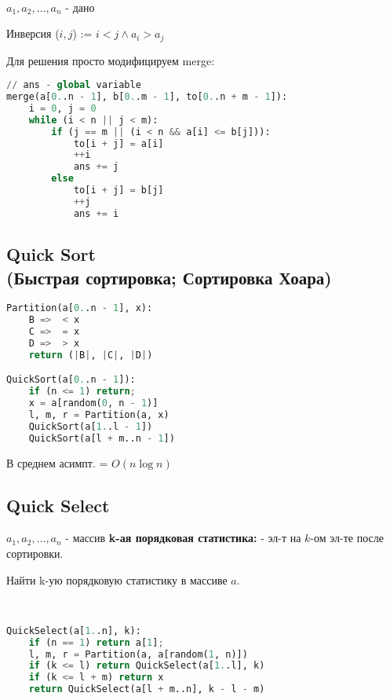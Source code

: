 \begin{task}
~\newline

$a_1, a_2, \ldots , a_n$ - дано

Инверсия ($i, j$) := $ i < j \land a_i > a_j$
\end{task}
\begin{solution}
Для решения просто модифицируем merge:

\lstset{style=mystyle}
\begin{lstlisting}[language=Python, caption=Merge for inversions]
// ans - global variable
merge(a[0..n - 1], b[0..m - 1], to[0..n + m - 1]):
    i = 0, j = 0
    while (i < n || j < m):
        if (j == m || (i < n && a[i] <= b[j])):
            to[i + j] = a[i]
            ++i
            ans += j
        else
            to[i + j] = b[j]
            ++j
            ans += i
\end{lstlisting}
\end{solution}

\subsection{Quick Sort \\ (Быстрая сортировка; Сортировка Хоара)}
\lstset{style=mystyle}
\begin{lstlisting}[language=Python, caption=Quick Sort]
Partition(a[0..n - 1], x):
    B =>  < x
    C =>  = x
    D =>  > x
    return (|B|, |C|, |D|)

QuickSort(a[0..n - 1]):
    if (n <= 1) return;
    x = a[random(0, n - 1)]
    l, m, r = Partition(a, x)
    QuickSort(a[1..l - 1])
    QuickSort(a[l + m..n - 1])
\end{lstlisting}
\begin{theorem}
В среднем асимпт. = $O(n \log n)$
\end{theorem}
\subsection{Quick Select}
\begin{definition}
$a_1, a_2, \ldots, a_n$ - массив
\textbf{k-ая порядковая статистика:} - эл-т на $k$-ом эл-те после сортировки.
\end{definition}
\begin{task}
Найти k-ую порядковую статистику в массиве $a$.
\end{task}
\begin{solution}
    ~\newline
    
\lstset{style=mystyle}
\begin{lstlisting}[language=Python, caption=QuickSelect]
QuickSelect(a[1..n], k):
    if (n == 1) return a[1];
    l, m, r = Partition(a, a[random(1, n)])
    if (k <= l) return QuickSelect(a[1..l], k)
    if (k <= l + m) return x
    return QuickSelect(a[l + m..n], k - l - m)
\end{lstlisting}
\end{solution}
